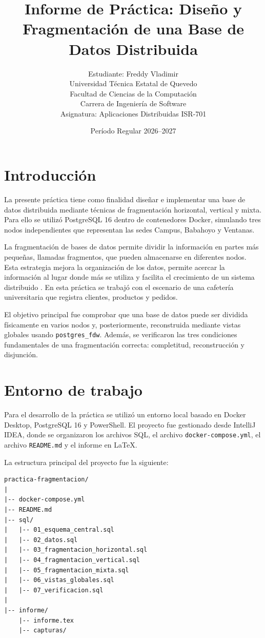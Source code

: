 \documentclass[12pt,a4paper]{article}
\title{\textbf{Informe de Práctica: Diseño y Fragmentación de una Base de Datos Distribuida}}
\author{
Estudiante: Freddy Vladimir\\
Universidad Técnica Estatal de Quevedo\\
Facultad de Ciencias de la Computación\\
Carrera de Ingeniería de Software\\
Asignatura: Aplicaciones Distribuidas ISR-701
}
\date{Período Regular 2026--2027}
\begin{document}
\maketitle

\section{Introducción}

La presente práctica tiene como finalidad diseñar e implementar una base de datos distribuida mediante técnicas de fragmentación horizontal, vertical y mixta. Para ello se utilizó PostgreSQL 16 dentro de contenedores Docker, simulando tres nodos independientes que representan las sedes Campus, Babahoyo y Ventanas.

La fragmentación de bases de datos permite dividir la información en partes más pequeñas, llamadas fragmentos, que pueden almacenarse en diferentes nodos. Esta estrategia mejora la organización de los datos, permite acercar la información al lugar donde más se utiliza y facilita el crecimiento de un sistema distribuido \cite{amer2020ddbs, ge2021knosys}. En esta práctica se trabajó con el escenario de una cafetería universitaria que registra clientes, productos y pedidos.

El objetivo principal fue comprobar que una base de datos puede ser dividida físicamente en varios nodos y, posteriormente, reconstruida mediante vistas globales usando \texttt{postgres\_fdw}. Además, se verificaron las tres condiciones fundamentales de una fragmentación correcta: completitud, reconstrucción y disjunción.

\section{Entorno de trabajo}

Para el desarrollo de la práctica se utilizó un entorno local basado en Docker Desktop, PostgreSQL 16 y PowerShell. El proyecto fue gestionado desde IntelliJ IDEA, donde se organizaron los archivos SQL, el archivo \texttt{docker-compose.yml}, el archivo \texttt{README.md} y el informe en \LaTeX.

La estructura principal del proyecto fue la siguiente:

\begin{lstlisting}
practica-fragmentacion/
|
|-- docker-compose.yml
|-- README.md
|-- sql/
|   |-- 01_esquema_central.sql
|   |-- 02_datos.sql
|   |-- 03_fragmentacion_horizontal.sql
|   |-- 04_fragmentacion_vertical.sql
|   |-- 05_fragmentacion_mixta.sql
|   |-- 06_vistas_globales.sql
|   |-- 07_verificacion.sql
|
|-- informe/
    |-- informe.tex
    |-- capturas/
\end{lstlisting}
\end{document}
